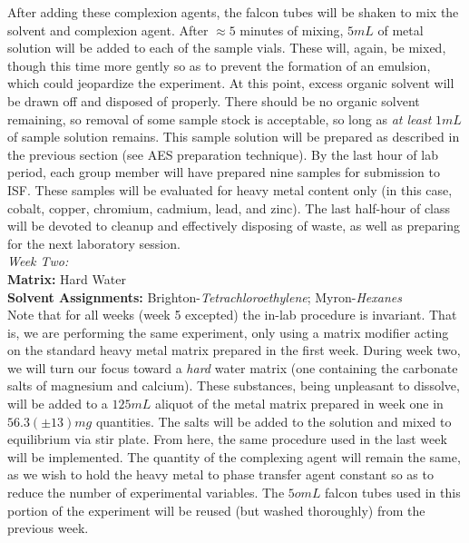 \documentclass[letterpaper,12pt]{article}
\begin{document}
	\indent
	After adding these complexion agents, the falcon tubes will be shaken to mix the solvent and complexion agent. After $\approx5$ minutes of mixing, $5mL$ of metal solution will be added to each of the sample vials. These will, again, be mixed, though this time more gently so as to prevent the formation of an emulsion, which could jeopardize the experiment. At this point, excess organic solvent will be drawn off and disposed of properly. There should be no organic solvent remaining, so removal of some sample stock is acceptable, so long as \emph{at least} $1mL$ of sample solution remains. This sample solution will be prepared as described in the previous section (see AES preparation technique). By the last hour of lab period, each group member will have prepared nine samples for submission to ISF. These samples will be evaluated for heavy metal content only (in this case, cobalt, copper, chromium, cadmium, lead, and zinc). The last half-hour of class will be devoted to cleanup and effectively disposing of waste, as well as preparing for the next laboratory session.\\
	\Large\emph{Week Two:}
	\tiny 
	\normalsize \\
	\textbf{Matrix:} Hard Water\\
	\textbf{Solvent Assignments:} Brighton-\emph{Tetrachloroethylene}; Myron-\emph{Hexanes}\\
	\indent Note that for all weeks (week 5 excepted) the in-lab procedure is invariant. That is, we are performing the same experiment, only using a matrix modifier acting on the standard heavy metal matrix prepared in the first week. During week two, we will turn our focus toward a \emph{hard} water\cite{c4} matrix (one containing the carbonate salts of magnesium and calcium). These substances, being unpleasant to dissolve, will be added to a $125mL$ aliquot of the metal matrix prepared in week one in $56.3(\pm13)mg$ quantities. The salts will be added to the solution and mixed to equilibrium via stir plate. From here, the same procedure used in the last week will be implemented. The quantity of the complexing agent will remain the same, as we wish to hold the heavy metal to phase transfer agent constant so as to reduce the number of experimental variables. The $5omL$ falcon tubes used in this portion of the experiment will be reused (but washed thoroughly) from the previous week. \\
\end{document}
